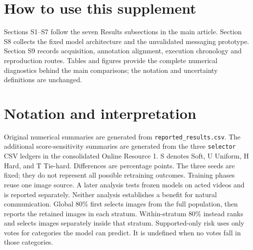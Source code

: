 \section*{How to use this supplement}
Sections S1--S7 follow the seven Results subsections in the main article. Section S8 collects the fixed model architecture and the unvalidated messaging prototype. Section S9 records acquisition, annotation alignment, execution chronology and reproduction routes. Tables and figures provide the complete numerical diagnostics behind the main comparisons; the notation and uncertainty definitions are unchanged.

\tableofcontents
\medskip
\section*{Notation and interpretation}
Original numerical summaries are generated from \texttt{reported\_results.csv}. The additional score-sensitivity summaries are generated from the three \texttt{selector} CSV ledgers in the consolidated Online Resource 1.
S denotes Soft, U Uniform, H Hard, and T Tie-hard. Differences are percentage points.
The three seeds are fixed; they do not represent all possible retraining outcomes.
Training phases reuse one image source. A later analysis tests frozen models on acted videos and is reported separately. Neither analysis establishes a benefit for natural communication.
Global 80\% first selects images from the full population, then reports the retained images in each stratum. Within-stratum 80\% instead ranks and selects images separately inside that stratum.
Supported-only risk uses only votes for categories the model can predict. It is undefined when no votes fall in those categories.
